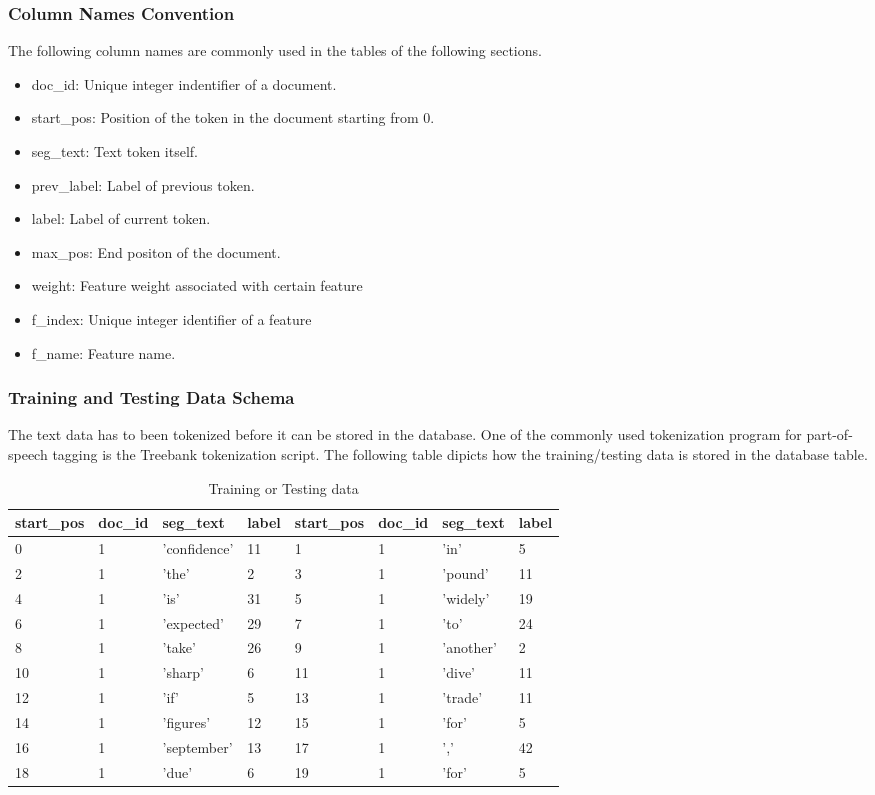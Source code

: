 \subsubsection{Column Names Convention}
The following column names are commonly used in the tables of the following sections.
\begin{itemize}
\item doc\_id: Unique integer indentifier of a document.
\item start\_pos: Position of the token in the document starting from 0.
\item seg\_text: Text token itself.
\item prev\_label: Label of previous token.
\item label: Label of current token.
\item max\_pos: End positon of the document.
\item weight: Feature weight associated with certain feature
\item f\_index: Unique integer identifier of a feature
\item f\_name: Feature name.
\end{itemize}

\subsubsection{Training and Testing Data Schema}
The text data has to been tokenized before it can be stored in the database. One of the commonly used tokenization program for part-of-speech
tagging is the Treebank tokenization script.
The following table dipicts how the training/testing data is stored in the database table.

\begin {table}[h]
\caption {Training or Testing data} \label{tab:trainingdata}
\begin{center}
    \footnotesize
\begin{tabular}{llll||llll}
  start\_pos & doc\_id & seg\_text & label & start\_pos & doc\_id & seg\_text & label\\
  \hline
        0&1&'confidence'&11& 1&1&'in'&5\\
        2&1&'the'&2& 3&1&'pound'&11\\
        4&1&'is'&31& 5&1&'widely'&19\\
        6&1&'expected'&29& 7&1&'to'&24\\
        8&1&'take'&26& 9&1&'another'&2\\
        10&1&'sharp'&6& 11&1&'dive'&11\\
        12&1&'if'&5& 13&1&'trade'&11\\
        14&1&'figures'&12& 15&1&'for'&5\\
        16&1&'september'&13& 17&1&','&42\\
        18&1&'due'&6& 19&1&'for'&5\\\hline
\end{tabular}
\end{center}
\end{table}


